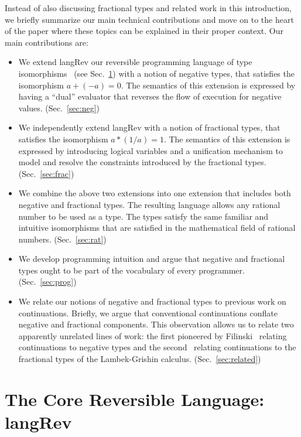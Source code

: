 \documentclass[preprint]{sigplanconf}
\begin{document}
Instead of also discussing fractional types and related work in this
introduction, we briefly summarize our main technical contributions and move
on to the heart of the paper where these topics can be explained in their
proper context. Our main contributions are:
\begin{itemize}
\item We extend {{langRev}} our reversible programming language of type
  isomorphisms~\cite{rc2011,infeffects} (see Sec.~\ref{sec:pi}) with a notion
  of negative types, that satisfies the isomorphism $a + (-a) = 0$. The
  semantics of this extension is expressed by having a ``dual'' evaluator
  that reverses the flow of execution for negative
  values. (Sec.~\ref{sec:neg})
\item We independently extend {{langRev}} with a notion of fractional types,
  that satisfies the isomorphism $a * (1/a) = 1$. The semantics of this
  extension is expressed by introducing logical variables and a unification
  mechanism to model and resolve the constraints introduced by the fractional
  types. (Sec.~\ref{sec:frac})
\item We combine the above two extensions into one extension that includes
  both negative and fractional types. The resulting language allows any
  rational number to be used as a type. The types satisfy the same familiar
  and intuitive isomorphisms that are satisfied in the mathematical field of
  rational numbers. (Sec.~\ref{sec:rat})
\item We develop programming intuition and argue that negative and fractional
  types ought to be part of the vocabulary of every
  programmer. (Sec.~\ref{sec:prog})
\item We relate our notions of negative and fractional types to previous work
  on continuations. Briefly, we argue that conventional continuations
  conflate negative and fractional components. This observation allows us to
  relate two apparently unrelated lines of work: the first pioneered by
  Filinski~\cite{Filinski:1989:DCI:648332.755574} relating continuations to
  negative types and the second~\cite{Bernardi:2010:CSL:1749618.1749689}
  relating continuations to the fractional types of the Lambek-Grishin
  calculus. (Sec.~\ref{sec:related})
\end{itemize}

\section{The Core Reversible Language: {{langRev}} }
\label{sec:pi}
\end{document}

